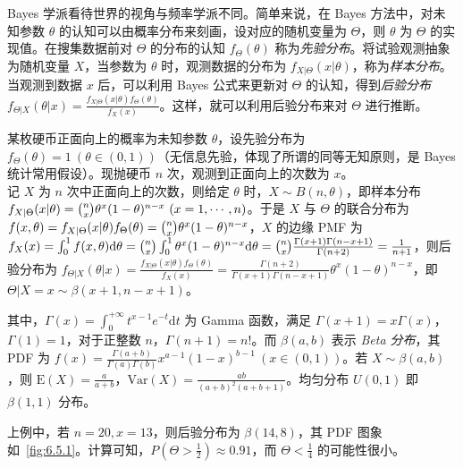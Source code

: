 \documentclass[../main.tex]{subfiles}
\begin{document}
Bayes 学派看待世界的视角与频率学派不同。简单来说，在 Bayes 方法中，对未知参数 $\theta$ 的认知可以由概率分布来刻画，设对应的随机变量为 $\Theta$，则 $\theta$ 为 $\Theta$ 的实现值。在搜集数据前对 $\Theta$ 的分布的认知 $f_\Theta(\theta)$ 称为\emph{先验分布}。将试验观测抽象为随机变量 $X$，当参数为 $\theta$ 时，观测数据的分布为 $f_{X|\Theta}(x|\theta)$，称为\emph{样本分布}。当观测到数据 $x$ 后，可以利用 Bayes 公式来更新对 $\Theta$ 的认知，得到\emph{后验分布} $f_{\Theta|X}(\theta|x)=\frac{f_{X|\Theta}(x|\theta)f_\Theta(\theta)}{f_X(x)}$。这样，就可以利用后验分布来对 $\Theta$ 进行推断。

\begin{example}
    某枚硬币正面向上的概率为未知参数 $\theta$，设先验分布为 $f_\Theta(\theta)=1\ (\theta\in(0,1))$（无信息先验，体现了所谓的同等无知原则，是 Bayes 统计常用假设）。现抛硬币 $n$ 次，观测到正面向上的次数为 $x$。\\
    记 $X$ 为 $n$ 次中正面向上的次数，则给定 $\theta$ 时，$X\sim B(n,\theta)$，即样本分布 $f_{X|\Theta}(x|\theta)=\tbinom nx\theta^x(1-\theta)^{n-x}\ (x=1,\cdots,n)$。于是 $X$ 与 $\Theta$ 的联合分布为 $f(x,\theta)=f_{X|\Theta}(x|\theta)f_\Theta(\theta)=\tbinom nx\theta^x(1-\theta)^{n-x}$，$X$ 的边缘 PMF 为 $f_X(x)=\int_0^1f(x,\theta)\mathrm d\theta=\tbinom nx\int_0^1\theta^x(1-\theta)^{n-x}\mathrm d\theta=\tbinom nx\frac{\Gamma(x+1)\Gamma(n-x+1)}{\Gamma(n+2)}=\frac1{n+1}$，则后验分布为 $f_{\Theta|X}(\theta|x)=\frac{f_{X|\Theta}(x|\theta)f_\Theta(\theta)}{f_X(x)}=\frac{\Gamma(n+2)}{\Gamma(x+1)\Gamma(n-x+1)}\theta^x(1-\theta)^{n-x}$，即 $\Theta|X=x\sim\beta(x+1,n-x+1)$。
\end{example}

其中，$\Gamma(x)=\int_0^{+\infty} t^{x-1}e^{-t}\mathrm dt$ 为 Gamma 函数，满足 $\Gamma(x+1)=x\Gamma(x)$，$\Gamma(1)=1$，对于正整数 $n$，$\Gamma(n+1)=n!$。而 $\beta(a,b)$ 表示 \emph{Beta 分布}，其 PDF 为 $f(x)=\frac{\Gamma(a+b)}{\Gamma(a)\Gamma(b)}x^{a-1}(1-x)^{b-1}\ (x\in(0,1))$。若 $X\sim\beta(a,b)$，则 $\mathrm E(X)=\frac a{a+b}$，$\mathrm{Var}(X)=\frac{ab}{(a+b)^2(a+b+1)}$。均匀分布 $U(0,1)$ 即 $\beta(1,1)$ 分布。

上例中，若 $n=20,x=13$，则后验分布为 $\beta(14,8)$，其 PDF 图象如~\ref{fig:6.5.1}。计算可知，$P(\Theta>\frac12)\approx0.91$，而 $\Theta<\frac14$ 的可能性很小。
\end{document}
